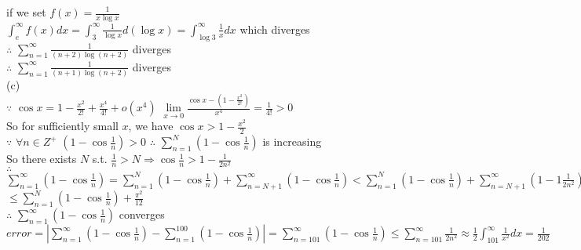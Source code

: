\documentclass{article}
\begin{document}
if we set $f(x) = \frac{1}{x \log{x}}$\\

$\displaystyle \int_e^\infty f(x)dx = \int_3^\infty \frac{1}{\log{x}}d(\log{x}) = \int_{\log{3}}^\infty \frac{1}{x}dx$ which diverges\\

$\therefore$ \qquad $\sum \limits_{n=1}^\infty \frac{1}{(n+2) \log{(n+2)}}$ diverges\\

$\therefore$ \qquad $\sum \limits_{n=1}^\infty \frac{1}{(n+1) \log{(n+2)}}$ diverges\\

(c)\\

$\because$ \qquad $\displaystyle \cos{x} = 1 -\frac{x^2}{2!} + \frac{x^4}{4!} + o(x^4)$ \qquad $\lim \limits_{x \to 0} \frac{\cos{x} - \left(1 - \frac{x^2}{2!}\right)}{x^4} = \frac{1}{4!} > 0$\\

So for sufficiently small $x$, we have $\cos{x} > 1 - \frac{x^2}{2}$\\

$\because$ \qquad $\forall n \in Z^+$ \quad $\displaystyle \left(1 - \cos{\frac{1}{n}}\right) > 0$ \qquad $\therefore$ \qquad $\displaystyle \sum \limits_{n=1}^N \left(1 - \cos{\frac{1}{n}}\right)$ is increasing\\

So there exists $N$ s.t. $\frac{1}{n} > N \Rightarrow \cos{\frac{1}{n}} > 1 - \frac{1}{2n^2}$\\ 

$\therefore$ \qquad $\displaystyle \sum \limits_{n=1}^\infty \left(1 - \cos{\frac{1}{n}}\right) = \sum \limits_{n=1}^N \left(1 - \cos{\frac{1}{n}}\right) + \sum \limits_{n=N+1}^\infty \left(1 - \cos{\frac{1}{n}}\right) < \sum \limits_{n=1}^N \left(1 - \cos{\frac{1}{n}}\right) + \sum \limits_{n=N+1}^\infty \left(1 - 1 \frac{1}{2n^2}\right)$\\

\hskip 10.08cm $\displaystyle \leq \sum \limits_{n=1}^N \left(1 - \cos{\frac{1}{n}}\right) + \frac{\pi^2}{12}$\\

$\therefore$ \qquad $\displaystyle \sum \limits_{n=1}^\infty \left(1 - \cos{\frac{1}{n}}\right)$ converges\\

$\displaystyle error = \left| \sum \limits_{n=1}^\infty \left(1 - \cos{\frac{1}{n}}\right) - \sum \limits_{n=1}^{100} \left(1 - \cos{\frac{1}{n}}\right)\right| = \sum \limits_{n=101}^\infty \left(1 - \cos{\frac{1}{n}}\right) \leq \sum \limits_{n = 101}^\infty \frac{1}{2n^2} \approx \frac{1}{2} \int_101^\infty \frac{1}{x^2}dx = \frac{1}{202}$\\
\end{document}
